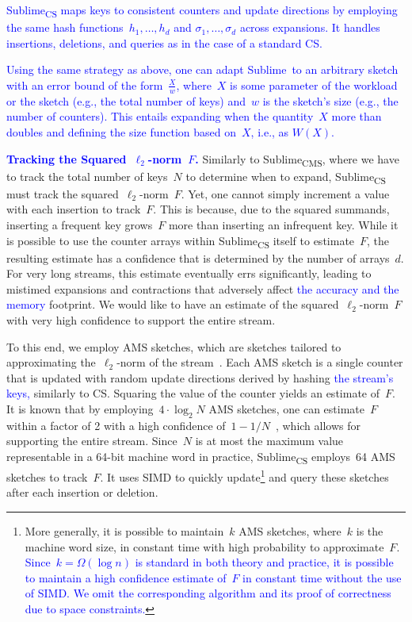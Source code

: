 \documentclass[sigconf]{acmart}
\newcommand{\sketch}{Sublime}
\newcommand{\sketchcms}{\sketch\textsubscript{CMS}\xspace}
\newcommand{\sketchcs}{\sketch\textsubscript{CS}\xspace}
\begin{document}
\textcolor{blue}{\sketchcs maps keys
to consistent counters and update directions by employing the same hash
functions~$h_1,\dots,h_d$ and $\sigma_1,\dots,\sigma_d$ across expansions. It
handles insertions, deletions, and queries as in the case of a standard CS.}

\textcolor{blue}{Using the same strategy as above, one can adapt \sketch\ to an
arbitrary sketch with an error bound of the form~$\frac{X}{w}$, where~$X$ is
some parameter of the workload or the sketch (e.g., the total number of keys)
and~$w$ is the sketch's size (e.g., the number of counters). This entails
expanding when the quantity~$X$ more than doubles and defining the size
function based on~$X$, i.e., as $W(X)$.}

\textcolor{blue}{
\textbf{Tracking the Squared~$\ell_2$-norm~$F$.}
}
Similarly to \sketchcms, where we have to track the total number of keys~$N$ to
determine when to expand, \sketchcs must track the squared~$\ell_2$-norm~$F$.
Yet, one cannot simply increment a value with each insertion to track~$F$. This
is because, due to the squared summands, inserting a frequent key grows~$F$
more than inserting an infrequent key. While it is possible to use the counter
arrays within \sketchcs itself to estimate~$F$, the resulting estimate has a
confidence that is determined by the number of arrays~$d$. For very long
streams, this estimate eventually errs significantly, leading to mistimed
expansions and contractions that adversely affect \textcolor{blue}{the accuracy
and the memory} footprint. We would like to have an estimate of the
squared~$\ell_2$-norm~$F$ with very high confidence to support the entire
stream. 

To this end, we employ AMS sketches, which are sketches tailored to
approximating the~$\ell_2$-norm of the stream~\cite{AMS}. Each AMS sketch is a
single counter that is updated with random update directions derived by hashing
\textcolor{blue}{the stream's keys,} similarly to CS. Squaring the value of the counter yields an
estimate of~$F$. It is known that by employing~$4 \cdot \log_2 N$ AMS sketches,
one can estimate~$F$ within a factor of 2 with a high confidence
of~$1-1/N$~\cite{AMS}, which allows for supporting the entire stream. Since~$N$
is at most the maximum value representable in a 64-bit machine word in
practice, \sketchcs employs~64 AMS sketches to track~$F$. It uses SIMD to
quickly update\footnote{More generally, it is possible to maintain~$k$ AMS
sketches, where~$k$ is the machine word size, in constant time with high
probability to approximate~$F$. \textcolor{blue}{Since~$k=\Omega(\log n)$ is
standard in both theory and practice, it is possible to maintain a high
confidence estimate of~$F$ in constant time without the use of SIMD. We omit
the corresponding algorithm and its proof of correctness due to space
constraints.}} and query these sketches after each insertion or deletion.
\end{document}
